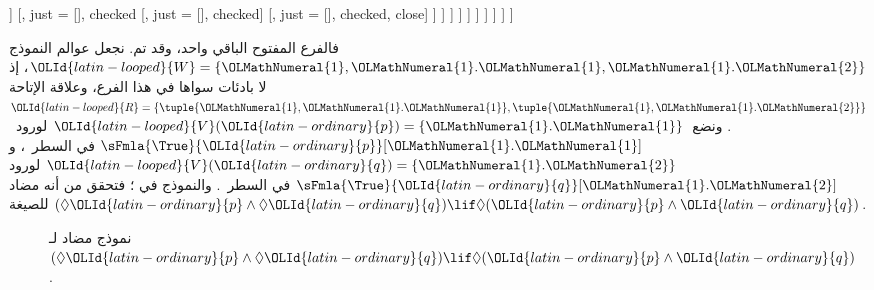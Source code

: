 \documentclass[../../../include/open-logic-section]{subfiles}
\begin{document}
{\begin{ex}
\begin{oltableau}
                      ]
                      [,
                        just = {\TRule{\False}{\land}[]}, checked
                        [,
                          just = {\TRule{\False}{\land}[]}, checked]
                        [,
                          just = {\TRule{\False}{\land}[]}, checked, close]
                      ]
                    ]
                  ]
                ]
              ]
            ]
          ]
        ]
      ]
    ]
  \end{oltableau}
  فالفرع المفتوح الباقي واحد، وقد تم. نجعل عوالم النموذج
  $\OLId{latin-looped}{W} = \{\OLMathNumeral{1}, \OLMathNumeral{1}.\OLMathNumeral{1}, \OLMathNumeral{1}.\OLMathNumeral{2}\}$، إذ لا بادئات سواها في هذا الفرع،
  وعلاقة الإتاحة
  $\OLId{latin-looped}{R} = \{\tuple{\OLMathNumeral{1}, \OLMathNumeral{1}.\OLMathNumeral{1}}, \tuple{\OLMathNumeral{1}, \OLMathNumeral{1}.\OLMathNumeral{2}}\}$.
  ونضع~$\OLId{latin-looped}{V}(\OLId{latin-ordinary}{p}) =
  \{\OLMathNumeral{1}.\OLMathNumeral{1}\}$ لورود~$\sFmla{\True}{\OLId{latin-ordinary}{p}}[\OLMathNumeral{1}.\OLMathNumeral{1}]$ في السطر~،
  و$\OLId{latin-looped}{V}(\OLId{latin-ordinary}{q}) = \{\OLMathNumeral{1}.\OLMathNumeral{2}\}$ لورود
  $\sFmla{\True}{\OLId{latin-ordinary}{q}}[\OLMathNumeral{1}.\OLMathNumeral{2}]$ في السطر~. والنموذج في
  ؛ فتحقق من أنه مضاد للصيغة
  $(\Diamond \OLId{latin-ordinary}{p} \land \Diamond \OLId{latin-ordinary}{q}) \lif \Diamond (\OLId{latin-ordinary}{p} \land \OLId{latin-ordinary}{q})$.
  \begin{figure}
  \begin{center}
  \end{center}
  \caption{نموذج مضاد لـ$(\Diamond \OLId{latin-ordinary}{p} \land \Diamond \OLId{latin-ordinary}{q}) \lif
    \Diamond (\OLId{latin-ordinary}{p} \land \OLId{latin-ordinary}{q})$.}
\end{figure}
\end{ex}          
}
\end{document}
